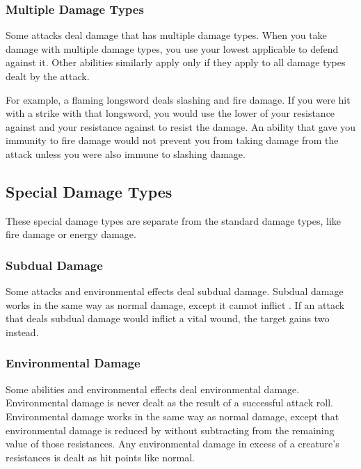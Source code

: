         \subsubsection{Multiple Damage Types}\label{Multiple Damage Types}
            Some attacks deal damage that has multiple damage types.
            When you take damage with multiple damage types, you use your lowest applicable  to defend against it.
            Other abilities similarly apply only if they apply to all damage types dealt by the attack.

            For example, a flaming longsword deals slashing and fire damage.
            If you were hit with a strike with that longsword, you would use the lower of your resistance against  and your resistance against  to resist the damage.
            An ability that gave you immunity to fire damage would not prevent you from taking damage from the attack unless you were also immune to slashing damage.

    \subsection{Special Damage Types}\label{Special Damage Types}

        These special damage types are separate from the standard damage types, like fire damage or energy damage.

        \subsubsection{Subdual Damage}\label{Subdual Damage}
            Some attacks and environmental effects deal subdual damage.
            Subdual damage works in the same way as normal damage, except it cannot inflict .
            If an attack that deals subdual damage would inflict a vital wound, the target gains two  instead.

        \subsubsection{Environmental Damage}\label{Environmental Damage}
            Some abilities and environmental effects deal environmental damage.
            Environmental damage is never dealt as the result of a successful attack roll.
            Environmental damage works in the same way as normal damage, except that environmental damage is reduced by  without subtracting from the remaining value of those resistances.
            Any environmental damage in excess of a creature's resistances is dealt as hit points like normal.

